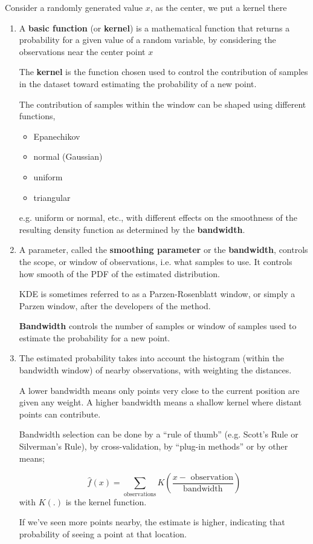 Consider a randomly generated value $x$, as the center, we put a kernel there
\begin{enumerate}
  
  \item A {\bf basic function} (or {\bf kernel}) is a mathematical function that
  returns a probability for a given value of a random variable, by considering
  the observations near the center point $x$

  The {\bf kernel} is the function chosen used to control the contribution of
  samples in the dataset toward estimating the probability of a new point.

  The contribution of samples within the window can be shaped using different
  functions, 
  \begin{itemize}
    \item Epanechikov
    \item normal (Gaussian)
    \item uniform 
    \item triangular
  \end{itemize}
  e.g. uniform or normal, etc., with different effects on the
  smoothness of the resulting density function as determined by the {\bf
  bandwidth}.


  \item A parameter, called the {\bf smoothing parameter} or the {\bf
  bandwidth}, controls the scope, or window of observations, i.e. what samples
  to use. It controls how smooth of the PDF of the estimated distribution.

KDE is sometimes referred to as a Parzen-Rosenblatt window, or simply a Parzen
window, after the developers of the method.

{\bf Bandwidth} controls the number of samples or window of samples used to
estimate the probability for a new point.
  
  \item The estimated probability takes into account the histogram (within the bandwidth window) of nearby
  observations, with weighting the distances.
  
  A lower bandwidth means only points very close to the current position are
  given any weight.
  A higher bandwidth means a shallow kernel where distant points can contribute.
  
  Bandwidth selection can be done by a “rule of thumb” (e.g.
  Scott’s Rule or Silverman’s Rule), by cross-validation, by “plug-in methods”
  or by other means;
  
  
  \begin{equation}
\hat{f}(x) = \sum_{\text{observations}} K(\frac{x - \text{ observation}}{\text{bandwidth}})
  \end{equation}
  with $K(.)$ is the kernel function.
   
  If we’ve seen more points nearby, the estimate is higher, indicating that
  probability of seeing a point at that location.
  
  
\end{enumerate}

